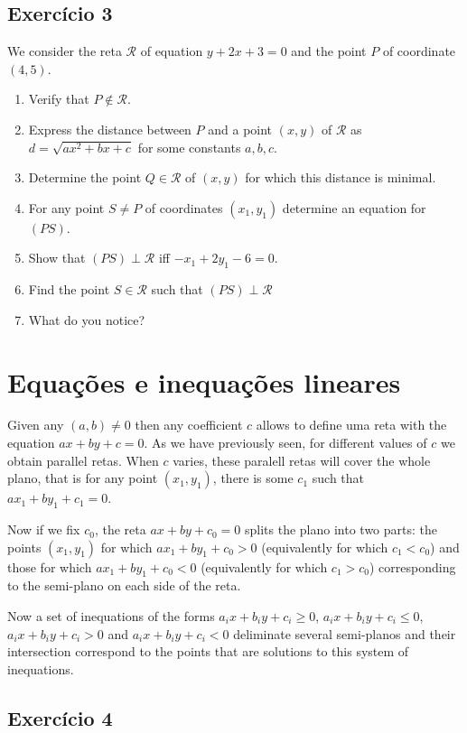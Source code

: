 \subsection*{Exercício 3}

We consider the reta $\mathcal R$ of equation $y+2x+3=0$ and the point $P$
of coordinate $(4,5)$.

\begin{enumerate}
\item Verify that $P \notin \mathcal R$.
\item Express the distance between $P$ and a point $(x,y)$ of
  $\mathcal R$ as $d=\sqrt{ax^2+bx+c}$ for some constants $a,b,c$.
\item Determine the point $Q \in \mathcal R$ of $(x,y)$ for which this distance
  is minimal.
\item For any point $S \neq P$ of coordinates $(x_1,y_1)$ determine an
  equation for $(PS)$.
\item Show that $(PS) \perp \mathcal R$ iff $-x_1+2y_1-6=0$.
\item Find the point $S \in \mathcal R$ such that $(PS) \perp \mathcal R$
\item What do you notice?
\end{enumerate}

\section{Equações e inequações lineares}

Given any $(a,b) \neq 0$ then any coefficient $c$ allows to define uma reta
with the equation $ax+by+c=0$. As we have previously seen, for different
values of $c$ we obtain parallel retas. When $c$ varies, these paralell retas
will cover the whole plano, that is for any point $(x_1,y_1)$, there is some
$c_1$ such that $ax_1+by_1+c_1=0$.

Now if we fix $c_0$, the reta $ax+by+c_0=0$ splits the plano into two parts:
the points $(x_1,y_1)$ for which $ax_1+by_1 + c_0 > 0$ (equivalently
for which $c_1 < c_0$)
and those for which $ax_1+by_1 + c_0 < 0$ (equivalently for which $c_1 > c_0$)
corresponding to the semi-plano on each side of the reta.

Now a set of inequations of the forms
$a_ix+b_iy + c_i \geq 0$, $a_ix+b_iy + c_i \leq 0$,
$a_ix+b_iy + c_i > 0$ and $a_ix+b_iy + c_i < 0$ deliminate several semi-planos
and their intersection correspond to the points that are solutions to this
system of inequations.

\subsection*{Exercício 4}

